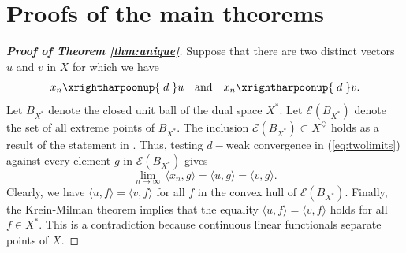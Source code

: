\documentclass[a4paper,12pt]{article}
\theoremstyle{definition}
\newcommand{\dpair}[2]{\langle#1, #2\rangle}
\numberwithin{equation}{section}
\begin{document}
\section{Proofs of the main theorems}

\begin{proof}[\bf Proof of Theorem \ref{thm:unique}]
Suppose that there are two distinct vectors $u$ and $v$ in $X$ for which we have
\begin{equation}\label{eq:twolimits}
	x_n \xrightharpoonup{\;d\;} u \quad\text{and}\quad x_n \xrightharpoonup{\;d\;} v. 
\end{equation}
Let $B_{X^*}$ denote the closed unit ball of the dual space $X^*$. Let 
$\mathcal{E}(B_{X^*})$ denote the set of all extreme points of $B_{X^*}$. The
inclusion $\mathcal{E}(B_{X^*}) \subset X^\diamondsuit$ holds as a result of
the statement in \cite[Corollary 3.5]{Walsh2018}. Thus, testing $d-$weak 
convergence in (\ref{eq:twolimits}) against every element $g$ in 
$\mathcal{E}(B_{X^*})$ gives
$$
\lim_{n\to\infty}\,\dpair{x_n}{g}=\dpair{u}{g}=\dpair{v}{g}.
$$
Clearly, we have $\dpair{u}{f}=\dpair{v}{f}$ for all $f$ in the convex hull of
$\mathcal{E}(B_{X^*})$.
Finally, the Krein-Milman theorem implies that the equality 
$\dpair{u}{f}=\dpair{v}{f}$ holds for all $f\in X^*$. This is a contradiction 
because continuous linear functionals separate points of $X$.
\end{proof}
\end{document}
